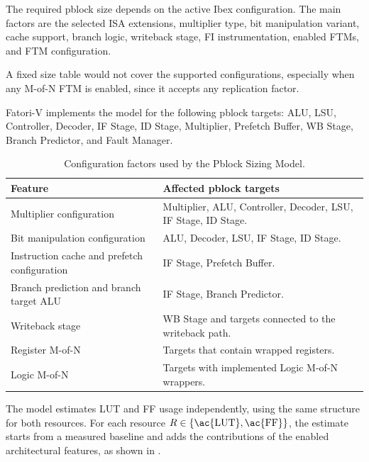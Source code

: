 The required pblock size depends on the active Ibex configuration. The main factors are the selected \ac{ISA} extensions, multiplier type, bit manipulation variant, cache support, branch logic, writeback stage, \ac{FI} instrumentation, enabled \acp{FTM}, and \ac{FTM} configuration. 

A fixed size table would not cover the supported configurations, especially when any M-of-N \ac{FTM} is enabled, since it accepts any replication factor.

\ac{Fatori-V} implements the model for the following pblock targets: \ac{ALU}, \ac{LSU}, Controller, Decoder, IF Stage, ID Stage, Multiplier, Prefetch Buffer, WB Stage, Branch Predictor, and Fault Manager.

\begin{table}[h]
\centering
\small
\setlength{\tabcolsep}{3.2pt}
\renewcommand{\arraystretch}{1.20}
\begin{tabularx}{0.92\textwidth}{|p{}|X|}
\hline
\rowcolor{tableheader}\textbf{Feature} &
\textbf{Affected pblock targets} \\
\hline
\hline
Multiplier configuration &
Multiplier, \ac{ALU}, Controller, Decoder, \ac{LSU}, IF Stage, ID Stage. \\
\hline
Bit manipulation configuration &
\ac{ALU}, Decoder, \ac{LSU}, IF Stage, ID Stage. \\
\hline
Instruction cache and prefetch configuration &
IF Stage, Prefetch Buffer. \\
\hline
Branch prediction and branch target \ac{ALU} &
IF Stage, Branch Predictor. \\
\hline
Writeback stage &
WB Stage and targets connected to the writeback path. \\
\hline
Register M-of-N &
Targets that contain wrapped registers. \\
\hline
Logic M-of-N &
Targets with implemented Logic M-of-N wrappers. \\
\hline
\end{tabularx}
\caption{Configuration factors used by the Pblock Sizing Model.}
\label{tab:pblock_model_factors}
\end{table}

The model estimates \ac{LUT} and \ac{FF} usage independently, using the same structure for both resources. For each resource \(R \in \{\text{\ac{LUT}}, \text{\ac{FF}}\}\), the estimate starts from a measured baseline and adds the contributions of the enabled architectural features, as shown in .

